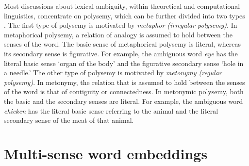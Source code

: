 \documentclass[11pt]{article}
\begin{document}
Most discussions about lexical ambiguity, within theoretical and computational
linguistics, concentrate on polysemy, which can be further divided into two
types \citep{Apresjan:1974,Pustejovsky:1995}. The first type of polysemy
is motivated by \emph{metaphor (irregular polysemy)}. In metaphorical polysemy,
a relation of analogy is assumed to hold between the senses of the word. The
basic sense of metaphorical polysemy is literal, whereas its secondary sense is
figurative. For example, the ambiguous word \emph{eye} has the literal basic
sense  `organ of the body' and the figurative secondary sense `hole in a
needle.' The other type of polysemy is motivated by \emph{metonymy (regular
polysemy)}. In metonymy, the relation that is assumed to hold between the
senses of the word is that of contiguity or connectedness.
In metonymic polysemy, both the basic and the secondary senses are literal. For
example, the ambiguous word \emph{chicken} has the literal basic sense
referring to the animal and the literal secondary sense of the meat of that
animal.

%


\section{Multi-sense word embeddings}
\end{document}
